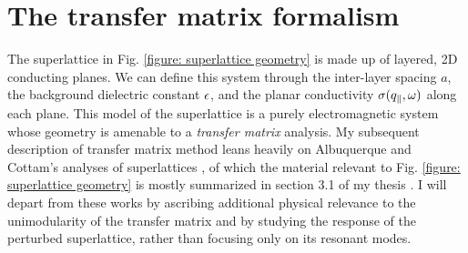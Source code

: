 \section{The transfer matrix formalism}

The superlattice in Fig. \ref{figure: superlattice geometry} is made up of layered, 2D conducting planes.  We can define this system through the inter-layer spacing $a$, the background dielectric constant $\epsilon$, and the planar conductivity $\sigma(q_{\parallel},\omega)$ along each plane.  This model of the superlattice is a purely electromagnetic system whose geometry is amenable to a {\it transfer matrix} analysis.  My subsequent description of transfer matrix method leans heavily on Albuquerque and Cottam's analyses of superlattices \cite{Cottam1993,Cottam2004}, of which the material relevant to Fig. \ref{figure: superlattice geometry} is mostly summarized in section 3.1 of my thesis \cite{Boyd2021}.  I will depart from these works by ascribing additional physical relevance to the unimodularity of the transfer matrix and by studying the response of the perturbed superlattice, rather than focusing only on its resonant modes.


